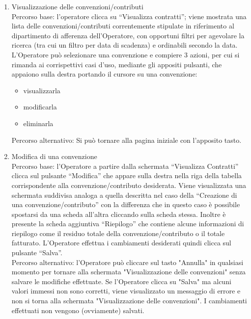 \begin{enumerate}
  \item Visualizzazione delle convenzioni/contributi\\

  Percorso base:
  l'operatore clicca su ``Visualizza contratti''; viene mostrata una lista delle convenzioni/contributi correntemente stipulate in 
  riferimento al dipartimento di afferenza dell'Operatore, con opportuni filtri 
  per agevolare la ricerca (tra cui un filtro per data di scadenza) e ordinabili secondo la data.
  L'Operatore può selezionare una convenzione e compiere 3 azioni, per cui si rimanda ai corrispettivi casi d'uso, mediante gli appositi pulsanti, che appaiono sulla destra portando il cursore su 
  una convenzione:
  \begin{itemize}
   \item visualizzarla
   \item modificarla
   \item eliminarla
  \end{itemize}		

  Percorso alternativo:
  Si può tornare alla pagina iniziale con l'apposito tasto.
 
  \item Modifica di una convenzione\\
  
  Percorso base:
  l'Operatore a partire dalla schermata ``Visualizza Contratti'' clicca sul pulsante ``Modifica'' che appare sulla destra nella riga 
  della tabella corrispondente alla convenzione/contributo desiderata. Viene visualizzata una schermata suddivisa analoga a quella
  descritta nel caso della ``Creazione di una convenzione/contributo'' con la differenza che in questo caso è possibile spostarsi da una scheda all'altra
  cliccando sulla scheda stessa. Inoltre è presente la scheda aggiuntiva ``Riepilogo'' che contiene alcune informazioni di riepilogo come il residuo
  totale della convenzione/contributo o il totale fatturato.
  L'Operatore effettua i cambiamenti desiderati quindi clicca sul pulsante ``Salva''.\\

  Percorso alternativo:
  l'Operatore può cliccare sul tasto "Annulla" in qualsiasi momento per tornare alla schermata "Visualizzazione delle convenzioni" senza salvare le modifiche effettuate.
  Se l'Operatore clicca su "Salva" ma alcuni valori immessi non sono corretti, viene visualizzato un messaggio di errore e non si torna alla schermata "Visualizzazione delle
  convenzioni". I cambiamenti effettuati non vengono (ovviamente) salvati.
  

\end{enumerate}
